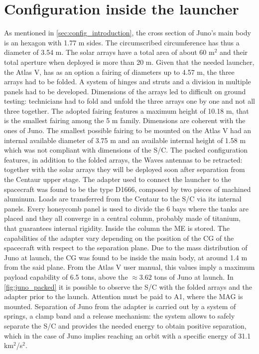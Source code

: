 \section{Configuration inside the launcher}
\label{sec:config_launcher}

As mentioned in \autoref{sec:config_introduction}, the cross section of Juno's main body is an hexagon with 1.77 m sides. The circumscribed circumference has thus a diameter of 3.54 m. The solar arrays have a total area of about 60 m$^2$ and their total aperture when deployed is more than 20 m.\cite{masses_ref} Given that the needed launcher, the Atlas V, has as an option a fairing of diameters up to 4.57 m, the three arrays had to be folded. A system of hinges and struts and a division in multiple panels had to be developed.\cite{solar_panels_coef} Dimensions of the arrays led to difficult on ground testing: technicians had to fold and unfold the three arrays one by one and not all three together.\cite{solar_panels_testing} The adopted fairing features a maximum height of 10.18 m, that is the smallest fairing among the 5 m family.\cite{atlas_manual} Dimensions are coherent with the ones of Juno. The smallest possible fairing to be mounted on the Atlas V had an internal available diameter of 3.75 m 
and an available internal height of 1.58 m which was not compliant with dimensions of the S/C. 
The packed configuration features, in addition to the folded arrays, the Waves antennas to be retracted: together with the solar arrays they will be deployed soon after separation from the Centaur upper stage. The adapter used to connect the launcher to the spacecraft was found to be the type D1666, composed by two pieces of machined aluminum. Loads are transferred from the Centaur to the S/C via its internal panels. Every honeycomb panel is used to divide the 6 bays where the tanks are placed and they all converge in a central column, probably made of titanium, that guarantees internal rigidity. Inside the column the ME is stored. The capabilities of the adapter vary depending on the position of the CG of the spacecraft with respect to the separation plane. Due to the mass distribution of Juno at launch, the CG was found to be inside the main body, at around 1.4 m from the said plane. From the Atlas V user manual\cite{atlas_manual}, this values imply a maximum payload capability of 6.5 tons, above the $\approx 3.62$ tons of Juno at launch.\cite{masses_ref}
In \autoref{fig:juno_packed}\cite{foto_fairing} it is possible to observe the S/C with the folded arrays and the adapter prior to the launch. Attention must be paid to A1, where the MAG is mounted. 
Separation of Juno from the adapter is carried out by a system of springs, a clamp band and a release mechanism: the system allows to safely separate the S/C and provides the needed energy to obtain positive separation, which in the case of Juno implies reaching an orbit with a specific energy of 31.1 km$^2$/s$^2$. 

